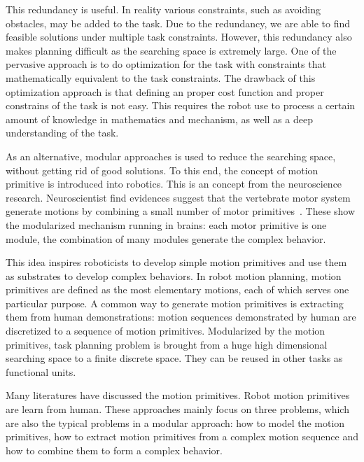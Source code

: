 This redundancy is useful. In reality various constraints, such as avoiding obstacles, may be added to the task. Due to the redundancy, we are able to find feasible solutions under multiple task constraints. However, this redundancy also makes planning difficult as the searching space is extremely large. One of the pervasive approach is to do optimization for the task with constraints that mathematically equivalent to the task constraints. The drawback of this optimization approach is that defining an proper cost function and proper constrains of the task is not easy. This requires the robot use to process a certain amount of knowledge in mathematics and mechanism, as well as a deep understanding of the task.

As an alternative, modular approaches is used to reduce the searching space, without getting rid of good solutions. To this end, the concept of motion primitive is introduced into robotics. This is an concept from the neuroscience research. Neuroscientist find evidences suggest that the vertebrate motor system generate motions by combining a small number of motor primitives~\citep{mussa1994linear,mussa1999modular,bizzi2008combining,grillner2011control}. These show the modularized mechanism running in brains: each motor primitive is one module, the combination of many modules generate the complex behavior.

This idea inspires roboticists to develop simple motion primitives and use them as substrates to develop complex behaviors. In robot motion planning, motion primitives are defined as the most elementary motions, each of which serves one particular purpose. A common way to generate motion primitives is extracting them from human demonstrations: motion sequences demonstrated by human are discretized to a sequence of motion primitives. Modularized by the motion primitives, task planning problem is brought from a huge high dimensional searching space to a finite discrete space.
They can be reused in other tasks as functional units. %

Many literatures have discussed the motion primitives. Robot motion primitives are learn from human. These approaches mainly focus on three problems, which are also the typical problems in a modular approach: how to model the motion primitives, how to extract motion primitives from a complex motion sequence and how to combine them to form a complex behavior.

